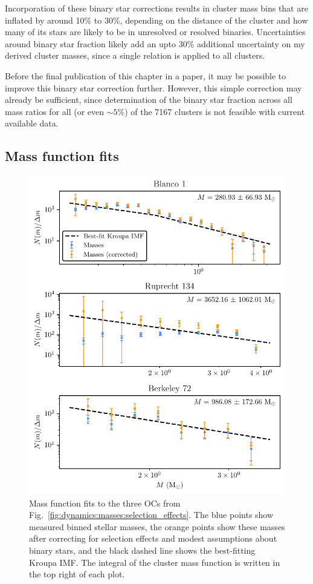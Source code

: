 Incorporation of these binary star corrections results in cluster mass bins that are inflated by around 10\% to 30\%, depending on the distance of the cluster and how many of its stars are likely to be in unresolved or resolved binaries. Uncertainties around binary star fraction likely add an upto 30\% additional uncertainty on my derived cluster masses, since a single relation is applied to all clusters. 

Before the final publication of this chapter in a paper, it may be possible to improve this binary star correction further. However, this simple correction may already be sufficient, since determination of the binary star fraction across all mass ratios for all (or even $\sim5$\%) of the 7167 clusters is not feasible with current available data.


\subsection{Mass function fits}
\label{sec:dynamics:masses:imf_fits}

\begin{figure}[p]
    \centering
    \includegraphics[width=\textwidth]{fig/c4/mass_functions.pdf}
    \caption[Mass function fits to the three OCs from Fig.~\ref{fig:dynamics:masses:selection_effects}]{Mass function fits to the three OCs from Fig.~\ref{fig:dynamics:masses:selection_effects}. The blue points show measured binned stellar masses, the orange points show these masses after correcting for selection effects and modest assumptions about binary stars, and the black dashed line shows the best-fitting Kroupa IMF. The integral of the cluster mass function is written in the top right of each plot.}
    \label{fig:dynamics:masses:mass_functions}
\end{figure}

